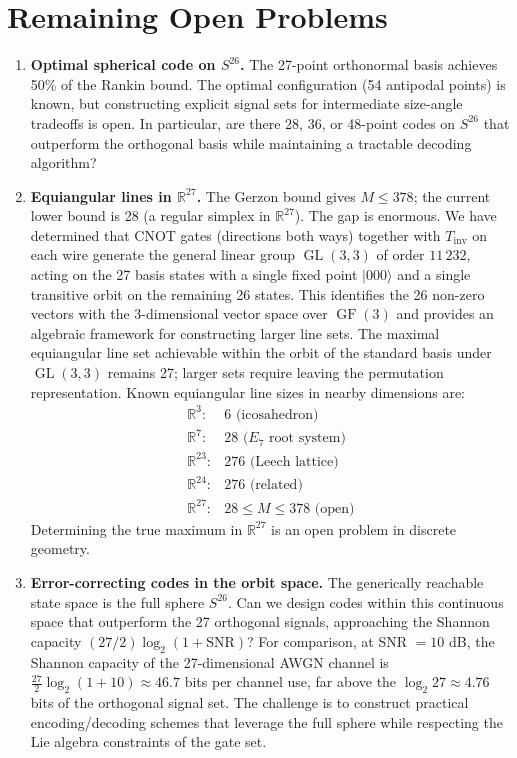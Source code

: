 \documentclass[12pt,a4paper]{article}
\newcommand{\GL}{\operatorname{GL}}
\begin{document}
\section{Remaining Open Problems}

\begin{enumerate}
\item \textbf{Optimal spherical code on $S^{26}$.} The 27-point
orthonormal basis achieves 50\% of the Rankin bound. The optimal
configuration (54 antipodal points) is known, but constructing
explicit signal sets for intermediate size-angle tradeoffs is open.
In particular, are there 28, 36, or 48-point codes on $S^{26}$ that
outperform the orthogonal basis while maintaining a tractable decoding
algorithm?

\item \textbf{Equiangular lines in $\mathbb{R}^{27}$.} The Gerzon
bound gives $M \le 378$; the current lower bound is 28 (a regular simplex
in $\mathbb{R}^{27}$). The gap is enormous. We have determined that CNOT gates (directions
both ways) together with $T_{\text{inv}}$ on each wire generate the
general linear group $\operatorname{GL}(3,3)$ of order $11\,232$,
acting on the 27 basis states with a single fixed point
$|000\rangle$ and a single transitive orbit on the remaining 26
states. This identifies the 26 non-zero vectors with the
3-dimensional vector space over $\operatorname{GF}(3)$ and provides
an algebraic framework for constructing larger line sets. The
maximal equiangular line set achievable within the orbit of the
standard basis under $\GL(3,3)$ remains 27; larger sets require
leaving the permutation representation.
Known equiangular line sizes in nearby dimensions are:
\[
\begin{array}{lc}
\mathbb{R}^3: & 6 \text{ (icosahedron)} \\
\mathbb{R}^7: & 28 \text{ ($E_7$ root system)} \\
\mathbb{R}^{23}: & 276 \text{ (Leech lattice)} \\
\mathbb{R}^{24}: & 276 \text{ (related)} \\
\mathbb{R}^{27}: & 28 \le M \le 378 \text{ (open)}
\end{array}
\]
Determining the true maximum in $\mathbb{R}^{27}$ is an open problem
in discrete geometry.

\item \textbf{Error-correcting codes in the orbit space.} The
generically reachable state space is the full sphere $S^{26}$.
Can we design codes within this continuous space that outperform
the 27 orthogonal signals, approaching the Shannon capacity
$(27/2)\log_2(1 + \text{SNR})$? For comparison, at SNR $= 10$ dB,
the Shannon capacity of the 27-dimensional AWGN channel is
$\frac{27}{2}\log_2(1+10) \approx 46.7$ bits per channel use, far
above the $\log_2 27 \approx 4.76$ bits of the orthogonal signal
set. The challenge is to construct practical encoding/decoding schemes
that leverage the full sphere while respecting the Lie algebra
constraints of the gate set.


\end{enumerate}
\end{document}
